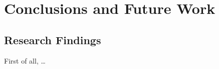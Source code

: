 \chapter[Conclusions and Future Work]{Conclusions and Future Work}\label{ch:conclusions}

\chaptertoc

\noindent \kant[27]

\section{Research Findings}\label{sec:conclusions-findings}

First of all, \ldots


